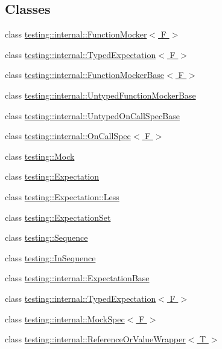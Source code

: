 \subsection*{Classes}
\begin{DoxyCompactItemize}
\item 
class \hyperlink{classtesting_1_1internal_1_1FunctionMocker}{testing\+::internal\+::\+Function\+Mocker$<$ F $>$}
\item 
class \hyperlink{classtesting_1_1internal_1_1TypedExpectation}{testing\+::internal\+::\+Typed\+Expectation$<$ F $>$}
\item 
class \hyperlink{classtesting_1_1internal_1_1FunctionMockerBase}{testing\+::internal\+::\+Function\+Mocker\+Base$<$ F $>$}
\item 
class \hyperlink{classtesting_1_1internal_1_1UntypedFunctionMockerBase}{testing\+::internal\+::\+Untyped\+Function\+Mocker\+Base}
\item 
class \hyperlink{classtesting_1_1internal_1_1UntypedOnCallSpecBase}{testing\+::internal\+::\+Untyped\+On\+Call\+Spec\+Base}
\item 
class \hyperlink{classtesting_1_1internal_1_1OnCallSpec}{testing\+::internal\+::\+On\+Call\+Spec$<$ F $>$}
\item 
class \hyperlink{classtesting_1_1Mock}{testing\+::\+Mock}
\item 
class \hyperlink{classtesting_1_1Expectation}{testing\+::\+Expectation}
\item 
class \hyperlink{classtesting_1_1Expectation_1_1Less}{testing\+::\+Expectation\+::\+Less}
\item 
class \hyperlink{classtesting_1_1ExpectationSet}{testing\+::\+Expectation\+Set}
\item 
class \hyperlink{classtesting_1_1Sequence}{testing\+::\+Sequence}
\item 
class \hyperlink{classtesting_1_1InSequence}{testing\+::\+In\+Sequence}
\item 
class \hyperlink{classtesting_1_1internal_1_1ExpectationBase}{testing\+::internal\+::\+Expectation\+Base}
\item 
class \hyperlink{classtesting_1_1internal_1_1TypedExpectation}{testing\+::internal\+::\+Typed\+Expectation$<$ F $>$}
\item 
class \hyperlink{classtesting_1_1internal_1_1MockSpec}{testing\+::internal\+::\+Mock\+Spec$<$ F $>$}
\item 
class \hyperlink{classtesting_1_1internal_1_1ReferenceOrValueWrapper}{testing\+::internal\+::\+Reference\+Or\+Value\+Wrapper$<$ T $>$}

\end{DoxyCompactItemize}
